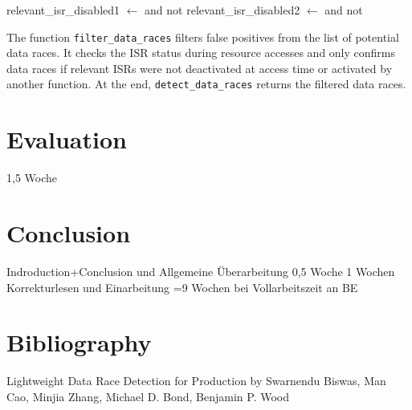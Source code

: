 \documentclass[
fancyheadings, %
%
%
]{stsreprt}
\begin{document}
{\begin{algorithm}[H]
{{			relevant\_isr\_disabled1 $\gets$  and not \;
			relevant\_isr\_disabled2 $\gets$  and not \;
			
		}
		\;
	}
	
	
\end{algorithm}

The function \texttt{filter\_data\_races} filters false positives from the list of potential data races. It checks the ISR status during resource accesses and only confirms data races if relevant ISRs were not deactivated at access time or activated by another function. At the end, \texttt{detect\_data\_races} returns the filtered data races.


\chapter{Evaluation}
1,5 Woche 
\chapter{Conclusion}
Indroduction+Conclusion und Allgemeine Überarbeitung 0,5 Woche
1 Wochen Korrekturlesen und Einarbeitung
=9 Wochen bei Vollarbeitszeit an BE
\appendix
}
\backmatter{}
\chapter{Bibliography}
Lightweight Data Race Detection for Production by Swarnendu Biswas, Man Cao, Minjia Zhang, Michael D. Bond, Benjamin P. Wood
\end{document}
